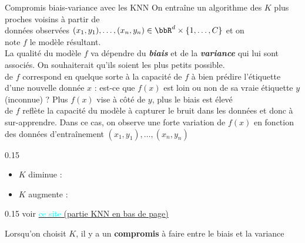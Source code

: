 \documentclass[10pt]{beamer}
\newcommand{\hsp}{\hspace*{1em}}
\begin{document}
\begin{frame}{Compromis biais-variance avec les KNN}
	\vspace*{-0.5em}
	 \hsp On entraîne un algorithme des $K$ plus proches voisins à partir de\\\phantom{\bftitle{Contexte} \hsp}données observées $(x_1,y_1),\dots,(x_n,y_n) \in \bbR^d \times \{1,\dots,C\}$ et on\\\phantom{\bftitle{Contexte} \hsp}note $f$ le modèle résultant.\\[0.8em]


	La qualité du modèle $f$ va dépendre du \textit{\textbf{biais}} et de la \textit{\textbf{variance}} qui lui sont associés. On souhaiterait qu'ils soient les plus petits possible.  \\[1em]
	
	 de $f$ correspond en quelque sorte à la capacité de $f$ à bien prédire l'étiquette d'une nouvelle donnée $x$ : est-ce que $f(x)$ est loin ou non de sa vraie étiquette $y$ (inconnue) ? Plus $f(x)$ vise à côté de $y$, plus le biais est élevé\\[1em]
	
	 de $f$ reflète la capacité du modèle à capturer le bruit dans les données et donc à sur-apprendre. Dans ce cas, on observe une forte variation de $f(x)$ en fonction des données d'entraînement $(x_1,y_1),\dots,(x_n,y_n)$\\[1em]

	
		\begin{minipc}[0.78]{0.15}
	\begin{itemize}
	\item $K$ diminue :  \\[0.5em]
	\item $K$ augmente :  \\[0.8em]
\end{itemize}
	\end{minipc}
	\begin{minipc}[0.2]{0.15}
voir \href{https://mlu-explain.github.io/bias-variance/}{\textcolor{cyan}{ce site} (partie KNN en bas de page)}
	\end{minipc}
	
	
	\begin{valblock}{}
Lorsqu'on choisit $K$, il y a un \textbf{compromis} à faire entre le biais et la variance
	\end{valblock}
\end{frame}
\end{document}
